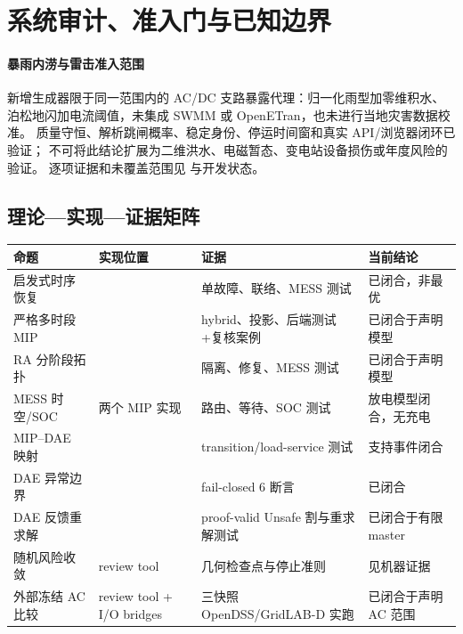 \section{系统审计、准入门与已知边界}\label{sec:res-audit}

\paragraph{暴雨内涝与雷击准入范围}
新增生成器限于同一范围内的 AC/DC 支路暴露代理：归一化雨型加零维积水、
泊松地闪加电流阈值，未集成 SWMM 或 OpenETran，也未进行当地灾害数据校准。
质量守恒、解析跳闸概率、稳定身份、停运时间窗和真实 API/浏览器闭环已验证；
不可将此结论扩展为二维洪水、电磁暂态、变电站设备损伤或年度风险的验证。
逐项证据和未覆盖范围见  与开发状态。

\subsection{理论—实现—证据矩阵}
\begin{center}\small
\begin{tabular}{@{}L{3.2cm}L{4.4cm}L{3.4cm}L{3.2cm}@{}}
\toprule
命题 & 实现位置 & 证据 & 当前结论\\\midrule
启发式时序恢复 &  & 单故障、联络、MESS 测试 & 已闭合，非最优\\
严格多时段 MIP &  & hybrid、投影、后端测试+复核案例 & 已闭合于声明模型\\
RA 分阶段拓扑 &  & 隔离、修复、MESS 测试 & 已闭合于声明模型\\
MESS 时空/SOC & 两个 MIP 实现 & 路由、等待、SOC 测试 & 放电模型闭合，无充电\\
MIP--DAE 映射 &  & transition/load-service 测试 & 支持事件闭合\\
DAE 异常边界 &  & fail-closed 6 断言 & 已闭合\\
DAE 反馈重求解 &  & proof-valid Unsafe 割与重求解测试 & 已闭合于有限 master\\
随机风险收敛 & review tool & 几何检查点与停止准则 & 见机器证据\\
外部冻结 AC 比较 & review tool + I/O bridges & 三快照 OpenDSS/GridLAB-D 实跑 & 已闭合于声明 AC 范围\\
\bottomrule
\end{tabular}
\end{center}

